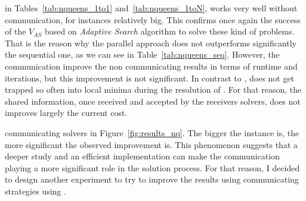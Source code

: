  in Tables~\ref{tab:nqueens_1to1} and~\ref{tab:nqueens_1toN}, works very well without communication, for instances relatively big. This confirms once again the success of the \om{} $V_{AS}$ based on {\it Adaptive Search} algorithm to solve these kind of problems. That is the reason why the parallel approach does not outperforms significantly the sequential one, as we can see in Table~\ref{tab:nqueens_seq}. However, the communication improve the non communicating results in terms of runtime and iterations, but this improvement is not significant. In contrast to \SGP, \posl{} does not get trapped so often into local minima during the resolution of \NQP{}. For that reason, the shared information, once received and accepted by the receivers solvers, does not improves largely the current cost.

 communicating solvers in Figure~\ref{fig:results_nq}. The bigger the instance is, the more significant the observed improvement is. This phenomenon suggests that a deeper study and an efficient implementation can make the communication playing a more significant role in the solution process. For that reason, I decided to design another experiment to try to improve the results using communicating strategies using \posl.


